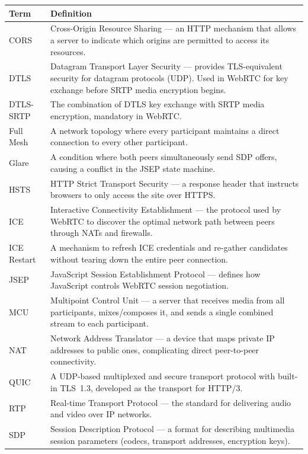 \documentclass[11pt,letterpaper]{article}
\begin{document}
\begin{longtable}{L{3.5cm}L{12cm}}
\toprule
\textbf{Term} & \textbf{Definition} \\
\midrule
\endhead
CORS & Cross-Origin Resource Sharing --- an HTTP mechanism that allows a server to indicate which origins are permitted to access its resources. \\
\midrule
DTLS & Datagram Transport Layer Security --- provides TLS-equivalent security for datagram protocols (UDP). Used in WebRTC for key exchange before SRTP media encryption begins. \\
\midrule
DTLS-SRTP & The combination of DTLS key exchange with SRTP media encryption, mandatory in WebRTC. \\
\midrule
Full Mesh & A network topology where every participant maintains a direct connection to every other participant. \\
\midrule
Glare & A condition where both peers simultaneously send SDP offers, causing a conflict in the JSEP state machine. \\
\midrule
HSTS & HTTP Strict Transport Security --- a response header that instructs browsers to only access the site over HTTPS. \\
\midrule
ICE & Interactive Connectivity Establishment --- the protocol used by WebRTC to discover the optimal network path between peers through NATs and firewalls. \\
\midrule
ICE Restart & A mechanism to refresh ICE credentials and re-gather candidates without tearing down the entire peer connection. \\
\midrule
JSEP & JavaScript Session Establishment Protocol --- defines how JavaScript controls WebRTC session negotiation. \\
\midrule
MCU & Multipoint Control Unit --- a server that receives media from all participants, mixes/composes it, and sends a single combined stream to each participant. \\
\midrule
NAT & Network Address Translator --- a device that maps private IP addresses to public ones, complicating direct peer-to-peer connectivity. \\
\midrule
QUIC & A UDP-based multiplexed and secure transport protocol with built-in TLS~1.3, developed as the transport for HTTP/3. \\
\midrule
RTP & Real-time Transport Protocol --- the standard for delivering audio and video over IP networks. \\
\midrule
SDP & Session Description Protocol --- a format for describing multimedia session parameters (codecs, transport addresses, encryption keys). \\

\end{longtable}
\end{document}
